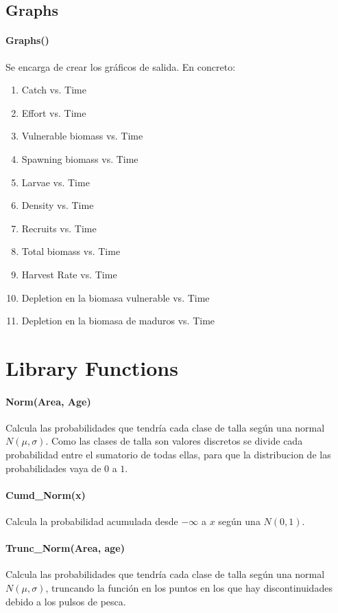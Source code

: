 		\subsection{Graphs}
			\paragraph{Graphs()} Se encarga de crear los gráficos de salida. En concreto:
				\begin{enumerate}
					\item Catch vs. Time
					\item Effort vs. Time
					\item Vulnerable biomass vs. Time
					\item Spawning biomass vs. Time
					\item Larvae vs. Time
					\item Density vs. Time
					\item Recruits vs. Time
					\item Total biomass vs. Time
					\item Harvest Rate vs. Time
					\item Depletion en la biomasa vulnerable vs. Time
					\item Depletion en la biomasa de maduros vs. Time
				\end{enumerate}
		
		
		

	\section{Library Functions}
	
	\paragraph{Norm(Area, Age)} Calcula las probabilidades que tendría cada clase de talla según una normal $N(\mu, \sigma)$. Como las clases de talla son valores discretos se divide cada probabilidad entre el sumatorio de todas ellas, para que la distribucion de las probabilidades vaya de $0$ a $1$.
	\paragraph{Cumd\_Norm(x)} Calcula la probabilidad acumulada desde $-\infty$ a $x$ según una $N(0,1)$.
	\paragraph{Trunc\_Norm(Area, age)} Calcula las probabilidades que tendría cada clase de talla según una normal $N(\mu, \sigma)$, truncando la función en los puntos en los que hay discontinuidades debido a los pulsos de pesca.

		

